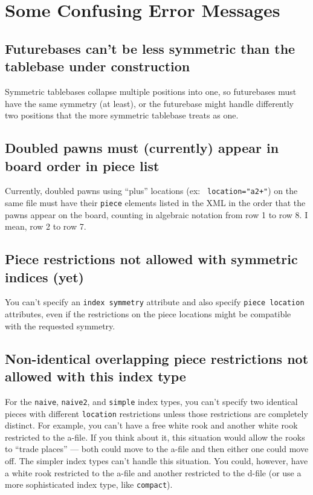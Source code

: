 \documentclass[11pt]{article}
\begin{document}
\vfill\eject

\section{Some Confusing Error Messages}


\subsection{Futurebases can't be less symmetric than the tablebase under construction}

Symmetric tablebases collapse multiple positions into one, so
futurebases must have the same symmetry (at least), or the futurebase
might handle differently two positions that the more symmetric
tablebase treats as one.

\subsection{Doubled pawns must (currently) appear in board order in piece list}

Currently, doubled pawns using ``plus'' locations (ex: {\tt
location="a2+"}) on the same file must have their {\tt piece} elements
listed in the XML in the order that the pawns appear on the board,
counting in algebraic notation from row 1 to row 8.  I mean, row 2 to
row 7.

\subsection{Piece restrictions not allowed with symmetric indices (yet)}

You can't specify an {\tt index symmetry} attribute and also specify
{\tt piece location} attributes, even if the restrictions on the piece
locations might be compatible with the requested symmetry.

\subsection{Non-identical overlapping piece restrictions not allowed with this index type}

For the {\tt naive}, {\tt naive2}, and {\tt simple} index types, you
can't specify two identical pieces with different {\tt location}
restrictions unless those restrictions are completely distinct.  For
example, you can't have a free white rook and another white rook
restricted to the a-file.  If you think about it, this situation would
allow the rooks to ``trade places'' --- both could move to the a-file
and then either one could move off.  The simpler index types can't
handle this situation.  You could, however, have a white rook
restricted to the a-file and another restricted to the d-file (or use
a more sophisticated index type, like {\tt compact}).
\end{document}
